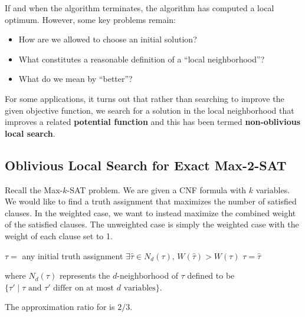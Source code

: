 If and when the algorithm terminates, the algorithm has computed a local optimum. However, some key problems remain:

\begin{itemize}
    \item How are we allowed to choose an initial solution?
    \item What constitutes a reasonable definition of a ``local neighborhood''?
    \item What do we mean by ``better''?
\end{itemize}

For some applications, it turns out that rather than searching to improve the given objective function, we search for a solution in the local neighborhood that improves a related \textbf{potential function} and this has been termed \textbf{non-oblivious local search}.

\subsection{Oblivious Local Search for Exact Max-2-SAT}

Recall the Max-$k$-SAT problem. We are given a CNF formula with $k$ variables. We would like to find a truth assignment that maximizes the number of satisfied clauses. In the weighted case, we want to instead maximize the combined weight of the satisfied clauses. The unweighted case is simply the weighted case with the weight of each clause set to 1.

\begin{codebox}
    \li $\tau = $ any initial truth assignment
    \li \While $\exists \hat{\tau} \in N_d(\tau),\, W(\hat{\tau}) > W(\tau)$ \Do
        \li $\tau = \hat{\tau}$
    \End
\end{codebox}
where $N_d(\tau)$ represents the $d$-neighborhood of $\tau$ defined to be $\{\tau' \mid \text{$\tau$ and $\tau'$ differ on at most $d$ variables}\}$.


\begin{theorem}
    The approximation ratio for  is $2/3$.
\end{theorem}

